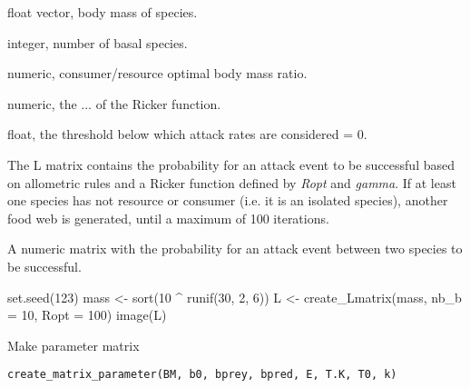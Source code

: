 \documentclass[letterpaper]{book}
\begin{document}
\begin{Arguments}
\begin{ldescription}
\item[\code{BM}] float vector, body mass of species.

\item[\code{nb\_b}] integer, number of basal species.

\item[\code{Ropt}] numeric, consumer/resource optimal body mass ratio.

\item[\code{gamma}] numeric, the ... of the Ricker function.

\item[\code{th}] float, the threshold below which attack rates are considered = 0.
\end{ldescription}
\end{Arguments}
%
\begin{Details}\relax
The L matrix contains the probability for an attack event to be
successful based on allometric rules and a Ricker function defined by
\emph{Ropt} and \emph{gamma}. If at least one species has not resource or
consumer (i.e. it is an isolated species), another food web is generated,
until a maximum of 100 iterations.
\end{Details}
%
\begin{Value}
A numeric matrix with the probability for an attack event between two
species to be successful.
\end{Value}
%
\begin{Examples}
\begin{ExampleCode}
set.seed(123)
mass <- sort(10 ^ runif(30, 2, 6))
L <- create_Lmatrix(mass, nb_b = 10, Ropt = 100)
image(L)
\end{ExampleCode}
\end{Examples}
%
\begin{Description}\relax
Make parameter matrix
\end{Description}
%
\begin{Usage}
\begin{verbatim}
create_matrix_parameter(BM, b0, bprey, bpred, E, T.K, T0, k)
\end{verbatim}
\end{Usage}
%
\end{document}
